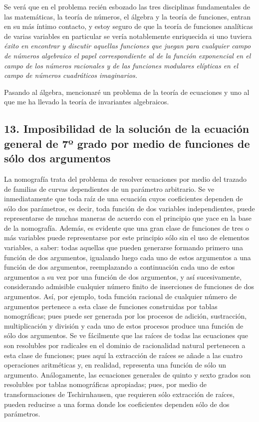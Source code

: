 \documentclass[a4paper, 12pt]{article}
\begin{document}
Se verá que en el problema recién esbozado las tres disciplinas fundamentales de las matemáticas, la teoría de números, el álgebra y la teoría de funciones, entran en su más íntimo contacto, y estoy seguro de que la teoría de funciones analíticas de varias variables en particular se vería notablemente enriquecida si uno tuviera \textit{éxito en encontrar y discutir aquellas funciones que juegan para cualquier campo de números algebraico el papel correspondiente al de la función exponencial en el campo de los números racionales y de las funciones modulares elípticas en el campo de números cuadráticos imaginarios.}

Pasando al álgebra, mencionaré un problema de la teoría de ecuaciones y uno al que me ha llevado la teoría de invariantes algebraicos.


\subsection*{13. Imposibilidad de la solución de la ecuación general
de 7º grado por medio de funciones de sólo dos argumentos}

La nomografía trata del problema de resolver ecuaciones por medio del trazado de familias de curvas dependientes de un parámetro arbitrario. Se ve inmediatamente que toda raíz de una ecuación cuyos coeficientes dependen de sólo dos parámetros, es decir, toda función de dos variables independientes, puede representarse de muchas maneras de acuerdo con el principio que yace en la base de la nomografía. Además, es evidente que una gran clase de funciones de tres o más variables puede representarse por este principio sólo sin el uso de elementos variables, a saber: todas aquellas que pueden generarse formando primero una función de dos argumentos, igualando luego cada uno de estos argumentos a una función de dos argumentos, reemplazando a continuación cada uno de estos argumentos a su vez por una función de dos argumentos, y así sucesivamente, considerando admisible cualquier número finito de inserciones de funciones de dos argumentos. Así, por ejemplo, toda función racional de cualquier número de argumentos pertenece a esta clase de funciones construidas por tablas nomográficas; pues puede ser generada por los procesos de adición, sustracción, multiplicación y división y cada uno de estos procesos produce una función de sólo dos argumentos. Se ve fácilmente que las raíces de todas las ecuaciones que son resolubles por radicales en el dominio de racionalidad natural pertenecen a esta clase de funciones; pues aquí la extracción de raíces se añade a las cuatro operaciones aritméticas y, en realidad, representa una función de sólo un argumento. Análogamente, las ecuaciones generales de quinto y sexto grados son resolubles por tablas nomográficas apropiadas; pues, por medio de transformaciones de Tschirnhausen, que requieren sólo extracción de raíces, pueden reducirse a una forma donde los coeficientes dependen sólo de dos parámetros.
\end{document}
